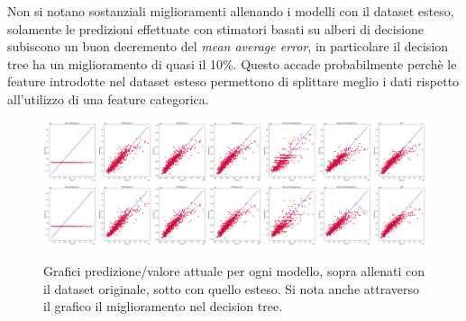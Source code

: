 \documentclass{article}
\begin{document}
Non si notano sostanziali miglioramenti allenando i modelli con il dataset
esteso, solamente le predizioni effettuate con stimatori basati su alberi di
decisione subiscono un buon decremento del \textit{mean average error}, in
particolare il decision tree ha un miglioramento di quasi il 10\%.
Questo accade probabilmente perchè le feature introdotte nel dataset esteso
permettono di splittare meglio i dati rispetto all'utilizzo di una feature
categorica.

\begin{figure}[ht]
	\centering
	\includegraphics[width=\textwidth]{predoriginal.png}
	\includegraphics[width=\textwidth]{predextended.png}
	\caption{Grafici predizione/valore attuale per ogni modello, sopra allenati
	con il dataset originale, sotto con quello esteso. Si nota anche attraverso
	il grafico il miglioramento nel decision tree.}
\end{figure}
\end{document}
